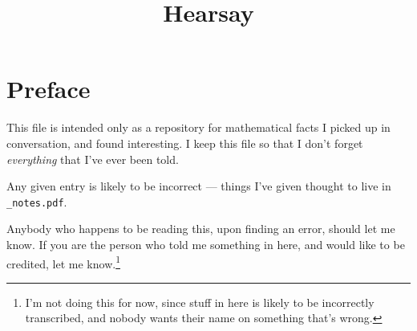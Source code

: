 \documentclass[11pt]{article}
\title{Hearsay}
\author{}
\date{}
\begin{document}
\tableofcontents
\newcommand{\HSsection}[2]{\section{#1 }}

\section*{Preface}
This file is intended only as a repository for mathematical facts I picked up in
conversation, and found interesting. I keep this file so that I don't forget
\emph{everything} that I've ever been told.

Any given entry is likely to be incorrect --- things I've given thought to live in \verb|_notes.pdf|.

Anybody who happens to be reading this, upon finding an
error, should let me know. If you are the person who told me something in here,
and would like to be credited, let me know.\footnote{I'm not doing this
for now, since stuff in here is likely to be incorrectly transcribed, and nobody
wants their name on something that's wrong.}
\end{document}
